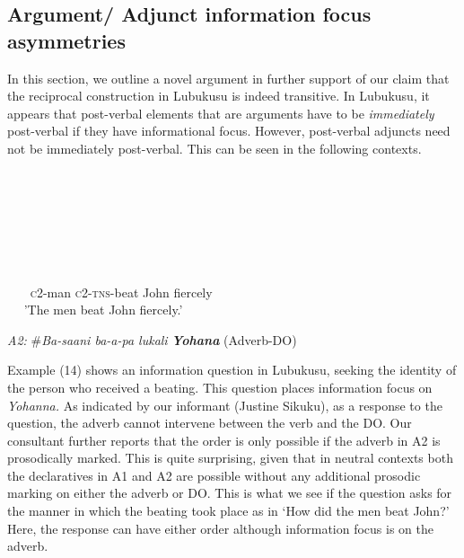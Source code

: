 \documentclass[output=paper]{langsci/langscibook}
\begin{document}
\subsection{Argument/ Adjunct information focus asymmetries}

  In this section, we outline a novel argument in further support of our claim that the reciprocal construction in Lubukusu is indeed transitive. In Lubukusu, it appears that post-verbal elements that are arguments have to be \textit{immediately} post-verbal if they have informational focus. However, post-verbal adjuncts need not be immediately post-verbal. This can be seen in the following contexts.

\setcounter{listWWviiiNumxlileveli}{0}
\begin{listWWviiiNumxlileveli}
\item \ea\label{ex:}
\\
\ea\label{ex:}
\\
\ea\label{ex:}
\\
\ea\label{ex:}
\\
\end{listWWviiiNumxlileveli}
\begin{listWWviiiNumxlileveli}
\ea\label{ex:}
\\
\end{listWWviiiNumxlileveli}
     ~~~   \textsc{c}2-man   \textsc{c2-tns}{}-beat   John     fiercely\\
~~   'The men beat John fiercely.'
\z

\glt \textit{A2:  }\#\textit{Ba-saani  ba-a-pa  lukali    }\textbf{\textit{Yohana}}  (Adverb-DO)  
\z

Example (14) shows an information question in Lubukusu, seeking the identity of the person who received a beating. This question places information focus on \textit{Yohanna.} As indicated by our informant (Justine Sikuku), as a response to the question, the adverb cannot intervene between the verb and the DO. Our consultant further reports that the order is only possible if the adverb in A2 is prosodically marked. This is quite surprising, given that in neutral contexts both the declaratives in A1 and A2 are possible without any additional prosodic marking on either the adverb or DO. This is what we see if the question asks for the manner in which the beating took place as in ‘How did the men beat John?’ Here, the response can have either order although information focus is on the adverb. 
\end{document}

